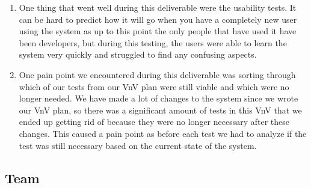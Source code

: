 \documentclass[12pt, titlepage]{article}
\begin{document}
\begin{enumerate}
    \item One thing that went well during this deliverable were the usability tests. It can be hard to predict how it will go when you have a completely new user using the system as up to this point the only people that have used it have been developers, but during this testing, the users were able to learn the system very quickly and struggled to find any confusing aspects. 
    \item One pain point we encountered during this deliverable was sorting through which of our tests from our VnV plan were still viable and which were no longer needed. We have made a lot of changes to the system since we wrote our VnV plan, so there was a significant amount of tests in this VnV that we ended up getting rid of because they were no longer necessary after these changes. This caused a pain point as before each test we had to analyze if the test was still necessary based on the current state of the system. 
\end{enumerate}  

\subsection*{Team}
\end{document}
